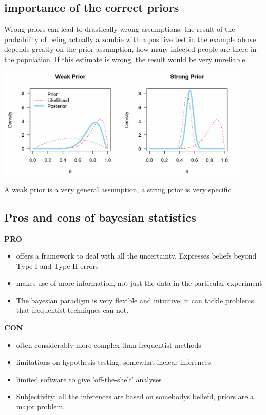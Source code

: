 \documentclass{article}
\begin{document}
\subsection{importance of the correct priors}
Wrong priors can lead to drastically wrong assumptions. the result of the probability of being actually a zombie with a positive test in the example above depends greatly on the prior assumption, how many infected people are there in the population. If this estimate is wrong, the result would be very unreliable.
\begin{center}
    \includegraphics[width = 0.9\textwidth]{bayesian/priors-bayesian.png}
\end{center}
A weak prior is a very general assumption, a string prior is very specific.

\subsection{Pros and cons of bayesian statistics}
\begin{minipage}{0.45\textwidth}
\textbf{PRO}
\begin{itemize}
    \item offers a framework to deal with all the uncertainty. Expresses beliefs beyond Type I and Type II errors
    \item makes use of more information, not just the data in the particular experiment
    \item The bayesian paradigm is very flexible and intuitive, it can tackle problems that frequentist techniques can not.
\end{itemize}
\end{minipage}
\begin{minipage}{0.45\textwidth}
\textbf{CON}
\begin{itemize}
    \item often considerably more complex than frequentist methods
    \item limitations on hypothesis testing, somewhat inclear inferences
    \item limited software to give 'off-the-shelf' analyses
    \item Subjectivity: all the inferences are based on somebodys beliefd, priors are a major problem.
\end{itemize}
\end{minipage} 
\end{document}
